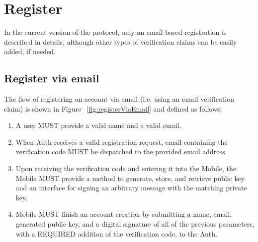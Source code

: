\section{Register}
 In the current version of the protocol, only an email-based registration is described in details, although 	
other types of verification claims can be easily added, if needed.

    \subsection{Register via email}
    The flow of registering an account via email (i.e. using an email verification claim) is shown in 
    Figure ~\ref{fig:registerViaEmail} and defined as follows:
    \begin{enumerate}
        \item A user MUST provide a valid name and a valid email.
        \item When Auth receives a valid registration request, email containing the verification code MUST 
                be dispatched to the provided email address.
        \item Upon receiving the verification code and entering it into the Mobile, the Mobile MUST provide 
                a method to generate, store, and retrieve public key and an interface for signing an arbitrary 
                message with the matching private key.
        \item Mobile MUST finish an account creation by submitting a name, email, generated public key, and 
                a digital signature of all of the previous parameters, with a REQUIRED addition of the 
                verification code, to the Auth.
    \end{enumerate}
  
    

